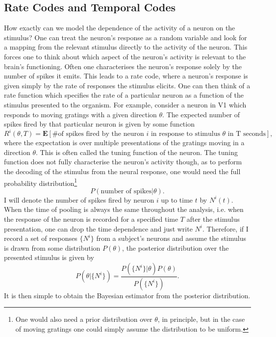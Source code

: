 \subsection{Rate Codes and Temporal Codes}

How exactly can we model the dependence of the activity of a neuron on the stimulus?
One can treat the neuron's response as a random variable and look for a mapping from the relevant stimulus directly to the activity of the 
neuron. This forces one to think about which aspect of the neuron's activity is relevant to the brain's functioning. Often one characterises the neuron's response solely by 
the number of spikes it emits. This leads to a rate code, where a neuron's response is given simply by the rate of responses the stimulus elicits. One can then think of a rate
function which specifies the rate of a particular neuron as a function of the stimulus presented to the organism. For example, consider a neuron in V1 which responds
to moving gratings with a given direction $\theta$. The expected number of spikes fired by that particular neuron is given by some function
\[
R^i(\theta,T) = \boldsymbol{E}\left[\#\textrm{of spikes fired by the neuron $i$ in response to stimulus }\theta\textrm{ in T seconds}\right],
\]
where the expectation is over multiple presentations of the gratings moving in a direction $\theta$.  This is often called the tuning function of the neuron. The tuning
function does not fully characterise the neuron's activity though, as to
perform the decoding of the stimulus from the neural response, one would need the full probability distribution\footnote{One would 
also need a prior distribution over $\theta$, in principle, but in the case of moving gratings one could simply assume the distribution to be uniform.}
$$P(\textrm{number of spikes}|\theta).$$
 I will denote  the number of spikes fired by neuron $i$ up to time $t$ by $N^i(t)$. When the time of pooling is 
always the same throughout the analysis, i.e. when the
response of the neuron is recorded for a specified time $T$ after the stimulus presentation, one can drop the time dependence and just write $N^i$. Therefore, if I record
a set of responses $\{N^i\}$ from a subject's neurons and assume the stimulus is drawn from some distribution $P(\theta)$,
the posterior distribution over the presented stimulus is given by
\[
P(\theta|\{N^i\}) = \frac{P(\{N^i\}|\theta)P(\theta)}{P(\{N^i\})}.
\]
It is then simple to obtain the Bayesian estimator from the posterior distribution.\par

